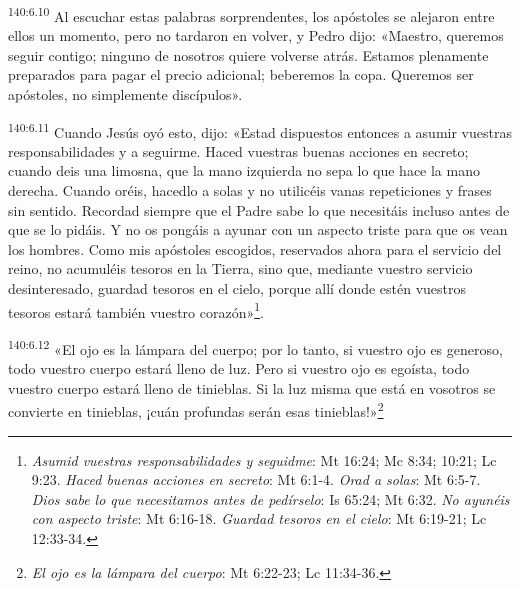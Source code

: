 \par 
\textsuperscript{140:6.10} Al escuchar estas palabras sorprendentes, los apóstoles se alejaron entre ellos un momento, pero no tardaron en volver, y Pedro dijo: «Maestro, queremos seguir contigo; ninguno de nosotros quiere volverse atrás. Estamos plenamente preparados para pagar el precio adicional; beberemos la copa. Queremos ser apóstoles, no simplemente discípulos».

\par 
\textsuperscript{140:6.11} Cuando Jesús oyó esto, dijo: «Estad dispuestos entonces a asumir vuestras responsabilidades y a seguirme. Haced vuestras buenas acciones en secreto; cuando deis una limosna, que la mano izquierda no sepa lo que hace la mano derecha. Cuando oréis, hacedlo a solas y no utilicéis vanas repeticiones y frases sin sentido. Recordad siempre que el Padre sabe lo que necesitáis incluso antes de que se lo pidáis. Y no os pongáis a ayunar con un aspecto triste para que os vean los hombres. Como mis apóstoles escogidos, reservados ahora para el servicio del reino, no acumuléis tesoros en la Tierra, sino que, mediante vuestro servicio desinteresado, guardad tesoros en el cielo, porque allí donde estén vuestros tesoros estará también vuestro corazón»\footnote{\textit{Asumid vuestras responsabilidades y seguidme}: Mt 16:24; Mc 8:34; 10:21; Lc 9:23. \textit{Haced buenas acciones en secreto}: Mt 6:1-4. \textit{Orad a solas}: Mt 6:5-7. \textit{Dios sabe lo que necesitamos antes de pedírselo}: Is 65:24; Mt 6:32. \textit{No ayunéis con aspecto triste}: Mt 6:16-18. \textit{Guardad tesoros en el cielo}: Mt 6:19-21; Lc 12:33-34.}.

\par 
\textsuperscript{140:6.12} «El ojo es la lámpara del cuerpo; por lo tanto, si vuestro ojo es generoso, todo vuestro cuerpo estará lleno de luz. Pero si vuestro ojo es egoísta, todo vuestro cuerpo estará lleno de tinieblas. Si la luz misma que está en vosotros se convierte en tinieblas, ¡cuán profundas serán esas tinieblas!»\footnote{\textit{El ojo es la lámpara del cuerpo}: Mt 6:22-23; Lc 11:34-36.}

